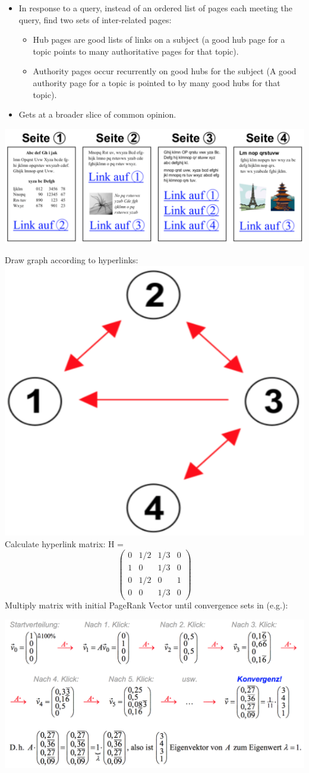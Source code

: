 \begin{breakbox}
\begin{itemize}
	\item In response to a query, instead of an ordered list of pages each meeting the query, find two sets of inter-related pages:
		\begin{itemize}
			\item Hub pages are good lists of links on a subject (a good hub page for a topic points to many authoritative pages for that topic).
			\item Authority pages occur recurrently on good hubs for the subject (A good authority page for a topic is pointed to by many good hubs for that topic).
		\end{itemize}
	\item Gets at a broader slice of common opinion.
\end{itemize}
\end{breakbox}

\begin{breakbox}
\begin{center}
\includegraphics[width=.13\textwidth]{slides_images/page_rank_pages}
\end{center}
Draw graph according to hyperlinks:
\newline \includegraphics[width=.03\textwidth]{slides_images/page_rank_graph}
\newline Calculate hyperlink matrix:
H = \[ \left( \begin{array}{cccc}
0 & 1/2 & 1/3 & 0 \\
1 & 0 & 1/3 & 0 \\
0 & 1/2 & 0 & 1 \\
0 & 0 & 1/3 & 0 \end{array} \right)\]
Multiply matrix with initial PageRank Vector until convergence sets in (e.g.):
\begin{center}
\includegraphics[width=.15\textwidth]{slides_images/page_rank_calc}
\end{center}
\end{breakbox}
